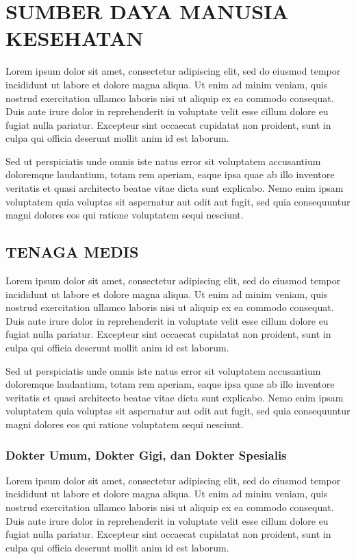 \chapter{SUMBER DAYA MANUSIA KESEHATAN}
Lorem ipsum dolor sit amet, consectetur adipiscing elit, sed do eiusmod tempor incididunt ut labore et dolore magna aliqua. Ut enim ad minim veniam, quis nostrud exercitation ullamco laboris nisi ut aliquip ex ea commodo consequat. Duis aute irure dolor in reprehenderit in voluptate velit esse cillum dolore eu fugiat nulla pariatur. Excepteur sint occaecat cupidatat non proident, sunt in culpa qui officia deserunt mollit anim id est laborum.

Sed ut perspiciatis unde omnis iste natus error sit voluptatem accusantium doloremque laudantium, totam rem aperiam, eaque ipsa quae ab illo inventore veritatis et quasi architecto beatae vitae dicta sunt explicabo. Nemo enim ipsam voluptatem quia voluptas sit aspernatur aut odit aut fugit, sed quia consequuntur magni dolores eos qui ratione voluptatem sequi nesciunt.

\section{TENAGA MEDIS}
Lorem ipsum dolor sit amet, consectetur adipiscing elit, sed do eiusmod tempor incididunt ut labore et dolore magna aliqua. Ut enim ad minim veniam, quis nostrud exercitation ullamco laboris nisi ut aliquip ex ea commodo consequat. Duis aute irure dolor in reprehenderit in voluptate velit esse cillum dolore eu fugiat nulla pariatur. Excepteur sint occaecat cupidatat non proident, sunt in culpa qui officia deserunt mollit anim id est laborum.

Sed ut perspiciatis unde omnis iste natus error sit voluptatem accusantium doloremque laudantium, totam rem aperiam, eaque ipsa quae ab illo inventore veritatis et quasi architecto beatae vitae dicta sunt explicabo. Nemo enim ipsam voluptatem quia voluptas sit aspernatur aut odit aut fugit, sed quia consequuntur magni dolores eos qui ratione voluptatem sequi nesciunt.

\subsection{Dokter Umum, Dokter Gigi, dan Dokter Spesialis}
Lorem ipsum dolor sit amet, consectetur adipiscing elit, sed do eiusmod tempor incididunt ut labore et dolore magna aliqua. Ut enim ad minim veniam, quis nostrud exercitation ullamco laboris nisi ut aliquip ex ea commodo consequat. Duis aute irure dolor in reprehenderit in voluptate velit esse cillum dolore eu fugiat nulla pariatur. Excepteur sint occaecat cupidatat non proident, sunt in culpa qui officia deserunt mollit anim id est laborum.

